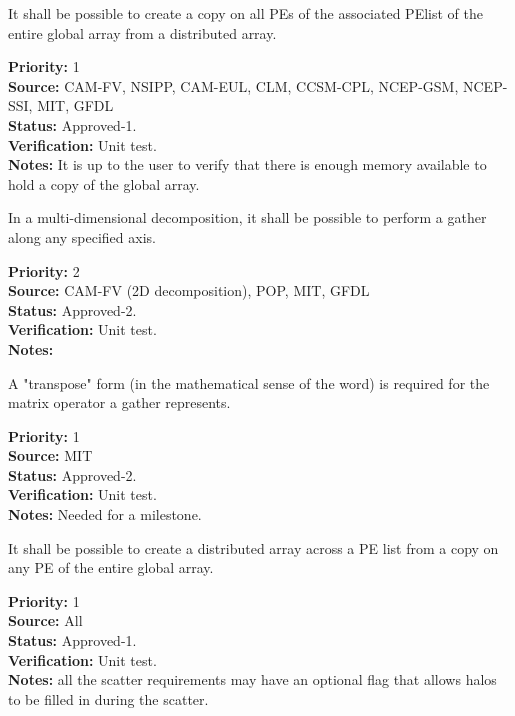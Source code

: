 
It shall be possible to create a copy on all PEs of the associated
PElist of the entire global array from a distributed array.

\begin{reqlist}
{\bf Priority:} 1 \\ 
{\bf Source:} CAM-FV, NSIPP, CAM-EUL, CLM, CCSM-CPL, NCEP-GSM, NCEP-SSI, MIT, GFDL \\
{\bf Status:} Approved-1. \\
{\bf Verification:} Unit test. \\
{\bf Notes:} It is up to the user to verify that there is enough
memory available to hold a copy of the global array.
\end{reqlist}

 \label{DG:PartGather}

In a multi-dimensional decomposition, it shall be possible to perform
a gather along any specified axis.

\begin{reqlist}
{\bf Priority:} 2 \\ 
{\bf Source:} CAM-FV (2D decomposition), POP, MIT, GFDL \\
{\bf Status:} Approved-2. \\
{\bf Verification:} Unit test. \\
{\bf Notes:} 
\end{reqlist}

A "transpose" form (in the mathematical sense of the word) is required
for the matrix operator a gather represents.
\begin{reqlist}
{\bf Priority:} 1 \\ 
{\bf Source:}  MIT \\
{\bf Status:} Approved-2. \\
{\bf Verification:} Unit test. \\
{\bf Notes:} Needed for a milestone.
\end{reqlist}


It shall be possible to create a distributed array across a PE list
from a copy on any PE of the entire global array.

\begin{reqlist}
{\bf Priority:} 1 \\ 
{\bf Source:} All\\
{\bf Status:} Approved-1. \\
{\bf Verification:} Unit test. \\
{\bf Notes:} all the scatter requirements may have an optional flag
that allows halos to be filled in during the scatter.
\end{reqlist}

